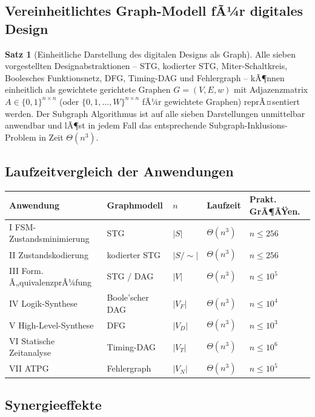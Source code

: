 ﻿\documentclass[a4paper,12pt]{article}
\theoremstyle{definition}
\newtheorem{satz}{Satz}
\begin{document}
\subsection{Vereinheitlichtes Graph-Modell fÃ¼r digitales Design}

\begin{satz}[Einheitliche Darstellung des digitalen Designs als Graph]\label{satz:unified}
  Alle sieben vorgestellten Designabstraktionen -- STG, kodierter STG, Miter-Schaltkreis,
  Boolesches Funktionsnetz, DFG, Timing-DAG und Fehlergraph -- kÃ¶nnen einheitlich als
  gewichtete gerichtete Graphen $G = (V, E, w)$ mit Adjazenzmatrix
  $A \in \{0,1\}^{n \times n}$ (oder $\{0,1,\ldots,W\}^{n \times n}$ fÃ¼r gewichtete
  Graphen) reprÃ¤sentiert werden. Der Subgraph Algorithmus \cite{subgraph2026}
  ist auf alle sieben Darstellungen unmittelbar anwendbar und lÃ¶st in jedem Fall das
  entsprechende Subgraph-Inklusions-Problem in Zeit $\Theta(n^3)$.
\end{satz}

\subsection{Laufzeitvergleich der Anwendungen}

\begin{center}
\begin{tabular}{lllll}
  \toprule
  Anwendung & Graphmodell & $n$ & Laufzeit & Prakt. GrÃ¶ÃŸen. \\
  \midrule
  I\;\; FSM-Zustandsminimierung & STG & $|S|$ & $\Theta(n^3)$ & $n \leq 256$ \\
  II\;\; Zustandskodierung & kodierter STG & $|S/{{\sim}}|$ & $\Theta(n^3)$ & $n \leq 256$ \\
  III\; Form. Ã„quivalenzprÃ¼fung & STG / DAG & $|V|$ & $\Theta(n^3)$ & $n \leq 10^5$ \\
  IV\;\; Logik-Synthese & Boole'scher DAG & $|V_F|$ & $\Theta(n^3)$ & $n \leq 10^4$ \\
  V\;\; High-Level-Synthese & DFG & $|V_D|$ & $\Theta(n^3)$ & $n \leq 10^3$ \\
  VI\;\; Statische Zeitanalyse & Timing-DAG & $|V_T|$ & $\Theta(n^3)$ & $n \leq 10^6$ \\
  VII\; ATPG & Fehlergraph & $|V_N|$ & $\Theta(n^3)$ & $n \leq 10^5$ \\
  \bottomrule
\end{tabular}
\end{center}

\subsection{Synergieeffekte}
\end{document}
